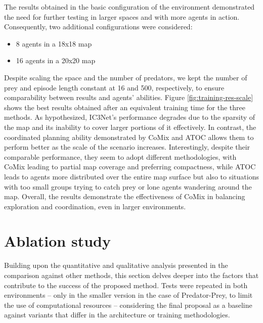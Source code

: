 \documentclass[a4paper,singleside,12pt]{report} %
\begin{document}
The results obtained in the basic configuration of the environment demonstrated the need for further testing in larger spaces and with more agents in action. Consequently, two additional configurations were considered:
\begin{itemize}
  \item 8 agents in a 18x18 map
  \item 16 agents in a 20x20 map
\end{itemize}
Despite scaling the space and the number of predators, we kept the number of prey and episode length constant at 16 and 500, respectively, to ensure comparability between results and agents' abilities. Figure \ref*{fig:training-res-scale} shows the best results obtained after an equivalent training time for the three methods. As hypothesized, IC3Net's performance degrades due to the sparsity of the map and its inability to cover larger portions of it effectively. In contrast, the coordinated planning ability demonstrated by CoMix and ATOC allows them to perform better as the scale of the scenario increases. Interestingly, despite their comparable performance, they seem to adopt different methodologies, with CoMix leading to partial map coverage and preferring compactness, while ATOC leads to agents more distributed over the entire map surface but also to situations with too small groups trying to catch prey or lone agents wandering around the map. Overall, the results demonstrate the effectiveness of CoMix in balancing exploration and coordination, even in larger environments.


\section{Ablation study}\label{ablation}

Building upon the quantitative and qualitative analysis presented in the comparison against other methods, this section delves deeper into the factors that contribute to the success of the proposed method. Tests were repeated in both environments -- only in the smaller version in the case of Predator-Prey, to limit the use of computational resources -- considering the final proposal as a baseline against variants that differ in the architecture or training methodologies.
\end{document}
